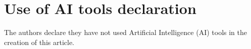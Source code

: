 \documentclass{dsfe}
\begin{document}



\section*{Use of AI tools declaration}
The authors declare they have not used Artificial Intelligence (AI) tools in the creation of this article.



\end{document}
